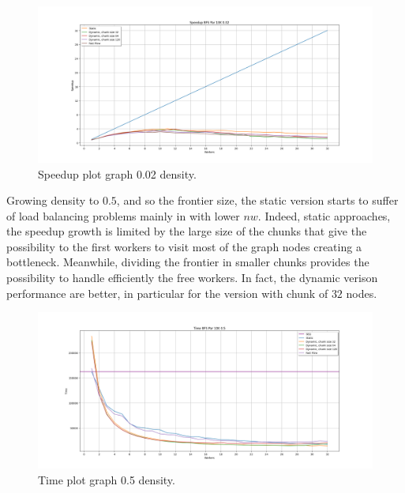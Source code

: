 \begin{figure}[htb!]
    \centering
    \includegraphics[width=\textwidth]{Figures/plot_map_speedup_vs10K002.png}
    \caption{Speedup plot graph 0.02 density.}
    \label{fig:plot_speedup_10k_002}
\end{figure}
\FloatBarrier
Growing density to $0.5$, and so the frontier size, the static version starts to suffer of load balancing problems mainly in with lower $nw$. Indeed, static approaches, the speedup growth is limited by the large size of the chunks that give the possibility to the first workers to visit most of the graph nodes creating a bottleneck. Meanwhile, dividing the frontier in smaller chunks provides the possibility to handle efficiently the free workers. In fact, the dynamic verison performance are better, in particular for the version with chunk of $32$ nodes.

\begin{figure}[htb!]
    \centering
    \includegraphics[width=\textwidth]{Figures/plot_map_time_vs10K05.png}
    \caption{Time plot graph 0.5 density.}
    \label{fig:plot_time_10k_05}
\end{figure}
\FloatBarrier

